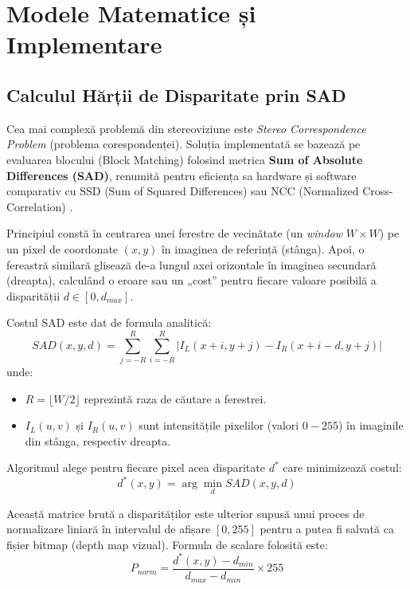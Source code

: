 \documentclass[12pt,a4paper]{report}
\begin{document}
\chapter{Modele Matematice și Implementare}

\section{Calculul Hărții de Disparitate prin SAD}
Cea mai complexă problemă din stereoviziune este \textit{Stereo Correspondence Problem} (problema corespondenței). Soluția implementată se bazează pe evaluarea blocului (Block Matching) folosind metrica \textbf{Sum of Absolute Differences (SAD)}, renumită pentru eficiența sa hardware și software comparativ cu SSD (Sum of Squared Differences) sau NCC (Normalized Cross-Correlation) \cite{scharstein2002taxonomy}.

Principiul constă în centrarea unei ferestre de vecinătate (un \textit{window} $W \times W$) pe un pixel de coordonate $(x,y)$ în imaginea de referință (stânga). Apoi, o fereastră similară glisează de-a lungul axei orizontale în imaginea secundară (dreapta), calculând o eroare sau un „cost” pentru fiecare valoare posibilă a disparității $d \in [0, d_{max}]$.

Costul SAD este dat de formula analitică:
\begin{equation}
    SAD(x, y, d) = \sum_{j=-R}^{R} \sum_{i=-R}^{R} \left| I_L(x+i, y+j) - I_R(x+i-d, y+j) \right|
\end{equation}
unde:
\begin{itemize}
    \item $R = \lfloor W/2 \rfloor$ reprezintă raza de căutare a ferestrei.
    \item $I_L(u,v)$ și $I_R(u,v)$ sunt intensitățile pixelilor (valori $0-255$) în imaginile din stânga, respectiv dreapta.
\end{itemize}

Algoritmul alege pentru fiecare pixel acea disparitate $d^*$ care minimizează costul:
\begin{equation}
    d^*(x,y) = \arg\min_{d} SAD(x, y, d)
\end{equation}

Această matrice brută a disparităților este ulterior supusă unui proces de normalizare liniară în intervalul de afișare $[0, 255]$ pentru a putea fi salvată ca fișier bitmap (depth map vizual). Formula de scalare folosită este:
\begin{equation}
    P_{norm} = \frac{d^*(x,y) - d_{min}}{d_{max} - d_{min}} \times 255
\end{equation}
\end{document}
